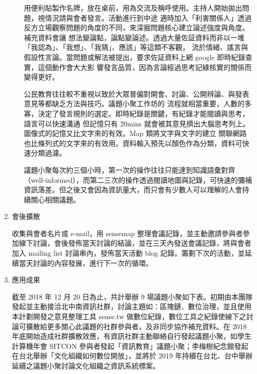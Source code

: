 \documentclass[12pt,a4paper]{article}
\begin{document}
\begin{enumerate}
\begin{enumerate}
用便利貼製作名牌，放在桌前，用為交流及稱呼使用。主持人開始拋出問題，視情況請與會者發言。活動進行到中途
適時加入「利害關係人」透過反方立場觀察問題的角度的不同，來深掘問題核心建立論述強度與角度。補充資料會讓
想法變論點，論點變論述。透過大量佐証資料而非以一堆「我認為」、「我想」、「我猜」、應該」等這類不客觀，
流於情緒、謠言與假設性言論。當問題或解法被提出，要求佐証資料上網 google 即時紀錄查實，這個動作會大大影
響發言品質，因為言論經過思考記綠核實的關係而變得更好。

公民教育往往較不重視以致於大眾普偏對開會、討論、公開辨論、與發表意見等都缺乏方法與技巧。議題小聚工作坊的
流程就相當重要，人數的多寡，決定了發言規則的選定。即時紀錄是關鍵，有紀錄才能閱讀與思考，語言可以快速溝通
但記憶只有 20mins 就會被其意見擠出大腦思考列上。圖像式的記憶又比文字來的有效。Map 類將文字與文字的建立
關聯網路也比條列式的文字來的有效用。資料輸入預先以顏色作為分類，資料可快速分類過濾。

議題小聚每次約三個小時，第一次的操作往往只能達到知識語彙對齊（well-informed），而第二三次的操作透過閱讀地圖與記錄，可快速的彌補資訊落差。但之後又會因為資訊量大，而只會有少數人可以理解的人會持續關心相關議題。
\end{enumerate}
\item 會後擴散
\label{sec:org5d3e570}

收集與會者名片或 e-mail，用 sensemap 整理會議記錄，並主動邀請參與者參加線下討論，會後發佈當天討論的結論，並在三天內發送會議記錄，將與會者加入 mailing list 討論串內，發佈當天活動 blog 記錄。籌劃下次的活動，並延續當天討論的內容發展，進行下一次的循環。

\item 應用成果
\label{sec:org782dd11}

截至 2018 年 12 月 20 日為止，共計舉辦 9 場議題小聚如下表。初期由本團隊發起並主動接洽北中南資訊社群，討論主題如：區塊鏈、數位治理，並且使用本計劃開發之意見整理工具 sense.tw 做數位紀錄，數位工具之紀錄使線下之討論可擴散給更多關心此議題的社群參與者，及非同步協作補充資料。在 2018 年底開始造成社群擴散效應，有資訊社群主動聯絡自行發起議題小聚，如學生計算機年會 SITCON 參與者發起「資訊教育」議題小聚；李梅樹紀念館發起在台北舉辦「文化組織如何數位開放」，並將於 2019 年持續在台北、台中舉辦延續之議題小聚討論文化組織之資訊系統標案。


\end{enumerate}
\end{document}
